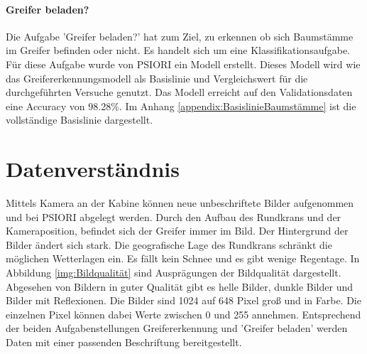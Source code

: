 	\paragraph{Greifer beladen?} Die Aufgabe 'Greifer beladen?' hat zum Ziel, zu erkennen ob sich Baumstämme im Greifer befinden oder nicht. Es handelt sich um eine Klassifikationsaufgabe. Für diese Aufgabe wurde von PSIORI ein Modell erstellt. Dieses Modell wird wie das Greifererkennungsmodell als Basislinie und Vergleichswert für die durchgeführten Versuche genutzt. Das Modell erreicht auf den Validationsdaten eine Accuracy von 98.28\%. Im Anhang \ref{appendix:BasislinieBaumstämme} ist die vollständige Basislinie dargestellt. 

	\section{Datenverständnis}
	\label{sec:DataUnderstanding}
	Mittels Kamera an der Kabine können neue unbeschriftete Bilder aufgenommen und bei PSIORI abgelegt werden. Durch den Aufbau des Rundkrans und der Kameraposition, befindet sich der Greifer immer im Bild. Der Hintergrund der Bilder ändert sich stark. Die geografische Lage des Rundkrans schränkt die möglichen Wetterlagen ein. Es fällt kein Schnee und es gibt wenige Regentage. In Abbildung  \ref{img:Bildqualität} sind Ausprägungen der Bildqualität dargestellt. Abgesehen von Bildern in guter Qualität gibt es helle Bilder, dunkle Bilder und Bilder mit Reflexionen. Die Bilder sind 1024 auf 648 Pixel groß und in Farbe. Die einzelnen Pixel können dabei Werte zwischen 0 und 255 annehmen. 
	Entsprechend der beiden Aufgabenstellungen Greifererkennung und 'Greifer beladen' werden Daten mit einer passenden Beschriftung bereitgestellt.
	
